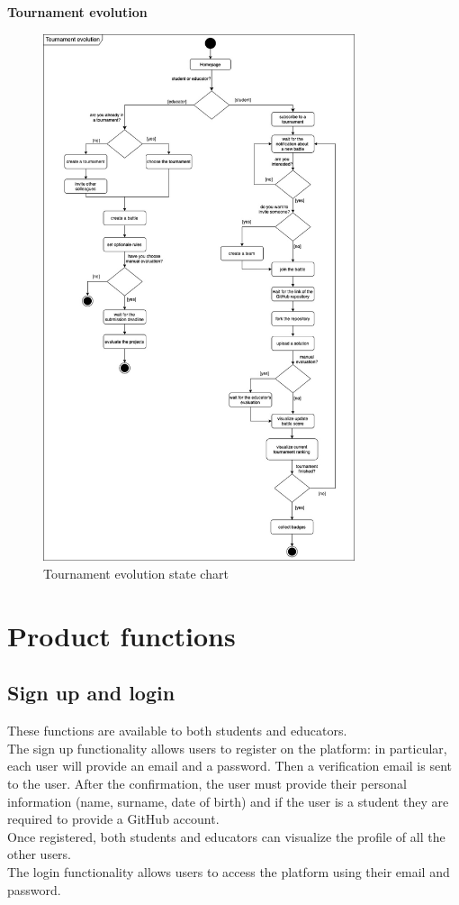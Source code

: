 \clearpage
\textbf{Tournament evolution}\\
\begin{figure} [H]
  \centering
  \includegraphics[width=0.815\textwidth]{images/Tournament_evolution.jpg}
  \caption{Tournament evolution state chart}
\end{figure} \vspace{1cm}

\section{Product functions}
\subsection{Sign up and login}
These functions are available to both students and educators.\\
The sign up functionality allows users to register on the platform: in particular, each user will provide an email 
and a password. Then a verification email is sent to the user.
After the confirmation, the user must provide their personal information (name, surname, date of birth) and 
if the user is a student they are required to provide a GitHub account.\\
Once registered, both students and educators can visualize the profile of all the other users.\\
The login functionality allows users to access the platform using their email and password.\\

